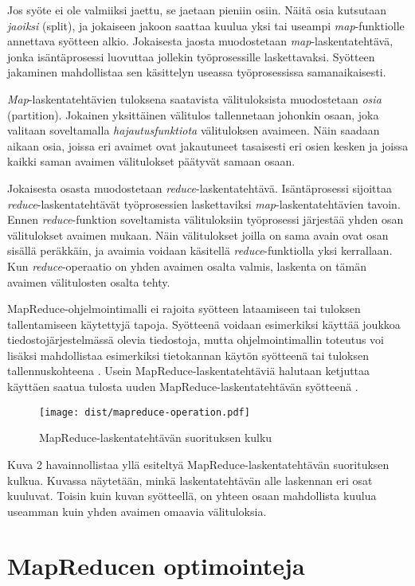 \documentclass[finnish]{templates/tktltiki2}
\theoremstyle{definition}
\theoremstyle{remark}
\begin{document}
Jos syöte ei ole valmiiksi jaettu, se jaetaan pieniin osiin. Näitä osia
kutsutaan \emph{jaoiksi} (split), ja jokaiseen jakoon saattaa kuulua
yksi tai useampi \emph{map}-funktiolle annettava syötteen alkio.
Jokaisesta jaosta muodostetaan \emph{map}-laskentatehtävä, jonka
isäntäprosessi luovuttaa jollekin työprosessille laskettavaksi. Syötteen
jakaminen mahdollistaa sen käsittelyn useassa työprosessissa
samanaikaisesti.

\emph{Map}-laskentatehtävien tuloksena saatavista välituloksista
muodostetaan \emph{osia} (partition). Jokainen yksittäinen välitulos
tallennetaan johonkin osaan, joka valitaan soveltamalla
\emph{hajautusfunktiota} välituloksen avaimeen. Näin saadaan aikaan
osia, joissa eri avaimet ovat jakautuneet tasaisesti eri osien kesken ja
joissa kaikki saman avaimen välitulokset päätyvät samaan osaan.

Jokaisesta osasta muodostetaan \emph{reduce}-laskentatehtävä.
Isäntäprosessi sijoittaa \emph{reduce}-laskentatehtävät työprosessien
laskettaviksi \emph{map}-laskentatehtävien tavoin. Ennen
\emph{reduce}-funktion soveltamista välituloksiin työprosessi järjestää
yhden osan välitulokset avaimen mukaan. Näin välitulokset joilla on sama
avain ovat osan sisällä peräkkäin, ja avaimia voidaan käsitellä
\emph{reduce}-funktiolla yksi kerrallaan. Kun \emph{reduce}-operaatio on
yhden avaimen osalta valmis, laskenta on tämän avaimen välitulosten
osalta tehty.

MapReduce-ohjelmointimalli ei rajoita syötteen lataamiseen tai tuloksen
tallentamiseen käytettyjä tapoja. Syötteenä voidaan esimerkiksi käyttää
joukkoa tiedostojärjestelmässä olevia tiedostoja, mutta
ohjelmointimallin toteutus voi lisäksi mahdollistaa esimerkiksi
tietokannan käytön syötteenä tai tuloksen tallennuskohteena \cite{mapreduce2}. Usein MapReduce-laskentatehtäviä halutaan ketjuttaa
käyttäen saatua tulosta uuden MapReduce-laskentatehtävän syötteenä
\cite{mapreduce}.

\begin{figure}[htbp]
\centering
\texttt{[image: dist/mapreduce-operation.pdf]}
\caption{MapReduce-laskentatehtävän suorituksen kulku}
\end{figure}

Kuva 2 havainnollistaa yllä esiteltyä MapReduce-laskentatehtävän
suorituksen kulkua. Kuvassa näytetään, minkä laskentatehtävän alle
laskennan eri osat kuuluvat. Toisin kuin kuvan syötteellä, on yhteen
osaan mahdollista kuulua useamman kuin yhden avaimen omaavia
välituloksia.

\section{MapReducen optimointeja}\label{mapreducen-optimointeja}
\end{document}
